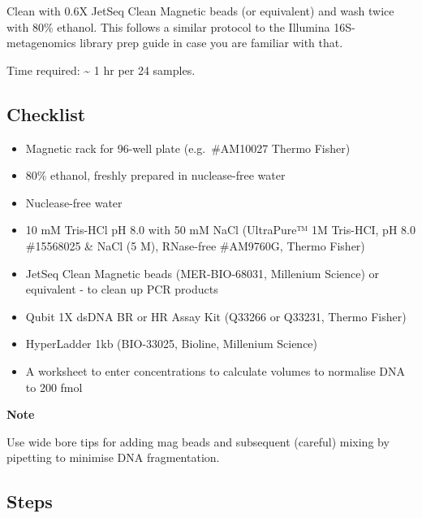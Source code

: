 \documentclass[
]{book}
\providecommand{\tightlist}{%
  \setlength{\itemsep}{0pt}\setlength{\parskip}{0pt}}
\begin{document}
Clean with 0.6X JetSeq Clean Magnetic beads (or equivalent) and wash twice with 80\% ethanol. This follows a similar protocol to the Illumina 16S-metagenomics library prep guide in case you are familiar with that.

Time required: \textasciitilde{} 1 hr per 24 samples.

\subsection{Checklist}\label{checklist-2}

\begin{itemize}
\tightlist
\item
  Magnetic rack for 96-well plate (e.g.~\#AM10027 Thermo Fisher)
\item
  80\% ethanol, freshly prepared in nuclease-free water
\item
  Nuclease-free water
\item
  10 mM Tris-HCl pH 8.0 with 50 mM NaCl (UltraPure™ 1M Tris-HCI, pH 8.0 \#15568025 \& NaCl (5 M), RNase-free \#AM9760G, Thermo Fisher)
\item
  JetSeq Clean Magnetic beads (MER-BIO-68031, Millenium Science) or equivalent - to clean up PCR products
\item
  Qubit 1X dsDNA BR or HR Assay Kit (Q33266 or Q33231, Thermo Fisher)
\item
  HyperLadder 1kb (BIO-33025, Bioline, Millenium Science)
\item
  A worksheet to enter concentrations to calculate volumes to normalise DNA to 200 fmol
\end{itemize}

\textbf{Note}

Use wide bore tips for adding mag beads and subsequent (careful) mixing by pipetting to minimise DNA fragmentation.

\subsection{Steps}\label{steps-1}
\end{document}
